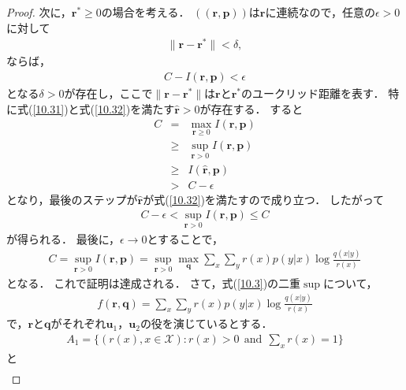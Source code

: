 \documentclass{ltjsarticle}
\theoremstyle{definition}
\begin{document}
\begin{proof}
  次に，$\mathbf{r}^* \geq 0$の場合を考える．
  $((\mathbf{r}, \mathbf{p}))$は$\mathbf{r}$に連続なので，任意の$\epsilon > 0$に対して
  \begin{eqnarray}
    \label{10.31}
    \parallel \mathbf{r} - \mathbf{r}^* \parallel < \delta,
  \end{eqnarray}
  ならば，
  \begin{eqnarray}
    \label{10.32}
    C - I(\mathbf{r}, \mathbf{p}) < \epsilon
  \end{eqnarray}
  となる$\delta > 0$が存在し，ここで$\parallel \mathbf{r} - \mathbf{r}^* \parallel$は$\mathbf{r}$と$\mathbf{r}^*$のユークリッド距離を表す．
  特に式(\ref{10.31})と式(\ref{10.32})を満たす$\hat{\mathbf{r}} > 0$が存在する．
  すると
  \begin{eqnarray}
    \label{10.33}
    C &=& \max_{\mathbf{r} \geq 0} I(\mathbf{r}, \mathbf{p}) \\
    \label{10.34}
    &\geq& \sup_{\mathbf{r} > 0} I(\mathbf{r}, \mathbf{p}) \\
    \label{10.35}
    &\geq& I(\hat{\mathbf{r}}, \mathbf{p}) \\
    \label{10.36}
    &>& C - \epsilon
  \end{eqnarray}
  となり，最後のステップが$\hat{\mathbf{r}}$が式(\ref{10.32})を満たすので成り立つ．
  したがって
  \begin{eqnarray}
    \label{10.37}
    C - \epsilon < \sup_{\mathbf{r} > 0} I(\mathbf{r}, \mathbf{p}) \leq C
  \end{eqnarray}
  が得られる．
  最後に，$\epsilon \rightarrow 0$とすることで，
  \begin{eqnarray}
    \label{10.38}
    C = \sup_{\mathbf{r} > 0} I(\mathbf{r}, \mathbf{p}) = \sup_{\mathbf{r} > 0} \max_{\mathbf{q}} \sum_{x} \sum_{y} r(x) p(y|x) \log \frac{q(x|y)}{r(x)}
  \end{eqnarray}
  となる．
  これで証明は達成される．
  さて，式(\ref{10.3})の二重$\sup$について，
  \begin{eqnarray}
    \label{10.39}
    f(\mathbf{r}, \mathbf{q}) = \sum_{x} \sum_{y} r(x) p(y|x) \log \frac{q(x|y)}{r(x)}
  \end{eqnarray}
  で，$\mathbf{r}$と$\mathbf{q}$がそれぞれ$\mathbf{u}_1$，$\mathbf{u}_2$の役を演じているとする．
  \begin{eqnarray}
    \label{10.40}
    A_1 = \{ ( r(x), x \in \mathcal{X} ) : r(x) > 0 \ \ \mbox{and} \ \  \sum_{x} r(x) = 1 \}
  \end{eqnarray}
  と
  \begin{eqnarray}
    \label{10.41}

\end{eqnarray}
\end{proof}
\end{document}

